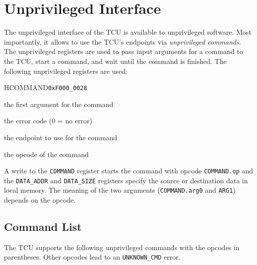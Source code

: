 \chapter{Unprivileged Interface}

The unprivileged interface of the TCU is available to unprivileged software. Most importantly, it
allows to use the TCU's endpoints via \emph{unprivileged commands}. The unprivileged registers are
used to pass input arguments for a command to the TCU, start a command, and wait until the command
is finished. The following unprivileged registers are used:

\begin{register}{H}{COMMAND}{\texttt{0xF000\_0028}}
  \regnewline%
  \begin{regdesc}\begin{reglist}
    \item[arg0] the first argument for the command
    \item[error] the error code (0 = no error)
    \item[ep] the endpoint to use for the command
    \item[op] the opcode of the command
  \end{reglist}\end{regdesc}
\end{register}

\noindent A write to the \texttt{COMMAND} register starts the command with opcode
\texttt{COMMAND.op} and the \texttt{DATA\_ADDR} and \texttt{DATA\_SIZE} registers specify the source
or destination data in local memory. The meaning of the two arguments (\texttt{COMMAND.arg0} and
\texttt{ARG1}) depends on the opcode.

\section{Command List}

The TCU supports the following unprivileged commands with the opcodes in parentheses. Other opcodes
lead to an \texttt{UNKNOWN\_CMD} error.


